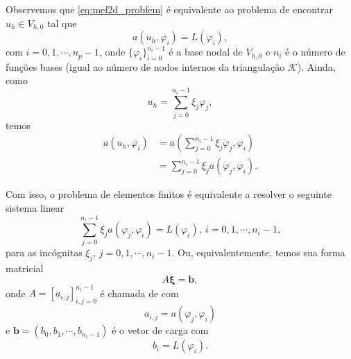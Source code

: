 Observemos que \eqref{eq:mef2d_probfem} é equivalente ao problema de encontrar $u_h\in V_{h,0}$ tal que
\begin{equation}\label{eq:mef2d_proba1}
  a(u_h,\varphi_i) = L(\varphi_i),
\end{equation}
com $i=0, 1, \cdots, n_p-1$, onde $\{\varphi_i\}_{i=0}^{n_i-1}$ é a base nodal de $V_{h,0}$ e $n_i$ é o número de funções bases (igual ao número de nodos internos da triangulação $\mathcal{K}$). Ainda, como
\begin{equation}
  u_h = \sum_{j=0}^{n_i-1} \xi_j\varphi_j,
\end{equation}
temos 
\begin{align}
  a(u_h, \varphi_i) &= a\left(\sum_{j=0}^{n_i-1}\xi_j\varphi_j,\varphi_i\right) \\
  &= \sum_{j=0}^{n_i-1}\xi_ja(\varphi_j,\varphi_i).
\end{align}

Com isso, o problema de elementos finitos é equivalente a resolver o seguinte sistema linear
\begin{equation}
  \sum_{j=0}^{n_i-1}\xi_ja(\varphi_j,\varphi_i) = L(\varphi_i),~i=0, 1, \cdots, n_i-1,
\end{equation}
para as incógnitas $\xi_j$, $j=0, 1, \cdots, n_i-1$. Ou, equivalentemente, temos sua forma matricial
\begin{equation}
  A\pmb{\xi} = \pmb{b},
\end{equation}
onde $A = [a_{i,j}]_{i,j=0}^{n_i-1}$ é chamada de  com
\begin{equation}
  a_{i,j} = a(\varphi_j, \varphi_i)
\end{equation}
e $\pmb{b} = (b_0, b_1, \cdots, b_{n_i-1})$ é o vetor de carga com
\begin{equation}
  b_i = L(\varphi_i).
\end{equation}


